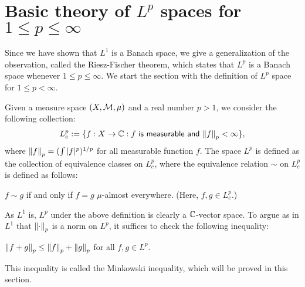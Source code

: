 \section{Basic theory of $L^p$ spaces for $1\leq p\leq \infty$}

Since we have shown that $L^1$ is a Banach space, we give a generalization of the observation, called the Riesz-Fischer theorem, which states that $L^p$ is a Banach space whenever $1\leq p\leq\infty$.
We start the section with the definition of $L^p$ space for $1\leq p<\infty$.

\begin{defi}
    Given a measure space $(X, {\mathcal{M}}, \mu)$ and a real number $p>1$, we consider the following collection:
    \begin{align*}
        L^p_c:=\{f: X\rightarrow{\mathbb{C}} : \textsf{$f$ is measurable and ${\left\lVert{f}\right\rVert}_p<\infty$}\},
    \end{align*}
    where ${\left\lVert{f}\right\rVert}_p=(\int |f|^p)^{1/p}$ for all measurable function $f$.
    The space $L^p$ is defined as the collection of equivalence classes on $L^p_c$, where the equivalence relation $\sim$ on $L^p_c$ is defined as follows:
    \begin{center}
        $f\sim g$ if and only if $f=g$ $\mu$-almost everywhere. (Here, $f, g\in L^p_c$.)
    \end{center}
\end{defi}

As $L^1$ is, $L^p$ under the above definition is clearly a ${\mathbb{C}}$-vector space.
To argue as in $L^1$ that ${\left\lVert{\cdot}\right\rVert}_p$ is a norm on $L^p$, it suffices to check the following inequality:
\begin{center}
    ${\left\lVert{f+g}\right\rVert}_p\leq{\left\lVert{f}\right\rVert}_p+{\left\lVert{g}\right\rVert}_p$ for all $f, g\in L^p$.
\end{center}
This inequality is called the Minkowski inequality, which will be proved in this section.

